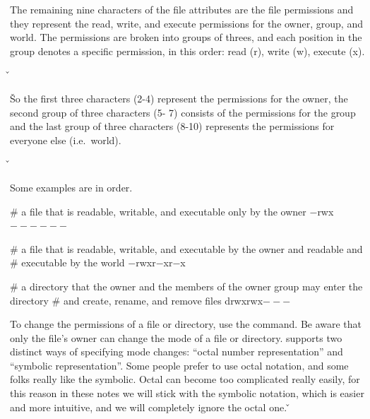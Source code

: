 The remaining nine characters of the file attributes are the file permissions and they represent the read, write, and
execute permissions for the owner, group, and world. The permissions are broken into groups of threes, and each
position in the group denotes a specific permission, in this order: read (r), write (w), execute (x).

\v


\v

So the first three characters (2-4) represent the permissions for the owner, the second group of three characters (5-
7) consists of the permissions for the group and the last group of three characters (8-10) represents the permissions
for everyone else (i.e.\ world).

\v


Some examples are in order.

\be
\begin{bash}
# a file that is readable, writable, and executable only by the owner
$-$rwx$------$
\end{bash}

\begin{bash}
# a file that is readable, writable, and executable by the owner and readable and
# executable by the world
$-$rwxr$-$xr$-$x
\end{bash}

\begin{bash}
# a directory that the owner and the members of the owner group may enter the directory
# and create, rename, and remove files
drwxrwx$---$
\end{bash}
\ee

To change the permissions of a file or directory, use the  command. Be aware that only the file's owner
can change the mode of a file or directory.  supports two distinct ways of specifying mode changes:
``octal number representation'' and ``symbolic representation''. Some people prefer to use octal notation, and some
folks really like the symbolic. Octal can become too complicated really easily, for this reason in these notes we
will stick with the symbolic notation, which is easier and more intuitive, and we will completely ignore the octal one.
\v


